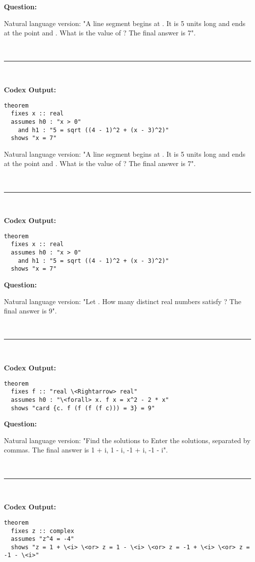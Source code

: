 \documentclass{article}
\begin{document}
\begin{boxB}
\textbf{Question:}

Natural language version: "A line segment begins at . 
It is 5 units long and ends at the point  and . 
What is the value of ? The final answer is 7".

\
\hrule
\

\textbf{Codex Output:}
\begin{lstlisting}
theorem
  fixes x :: real
  assumes h0 : "x > 0"
    and h1 : "5 = sqrt ((4 - 1)^2 + (x - 3)^2)"
  shows "x = 7"
\end{lstlisting}
\end{boxB}

\begin{boxB}
Natural language version: "A line segment begins at . 
It is 5 units long and ends at the point  and . 
What is the value of ? The final answer is 7".

\
\hrule
\

\textbf{Codex Output:}
\begin{lstlisting}
theorem
  fixes x :: real
  assumes h0 : "x > 0"
    and h1 : "5 = sqrt ((4 - 1)^2 + (x - 3)^2)"
  shows "x = 7"  
\end{lstlisting}
\end{boxB}



\begin{boxB}
\textbf{Question:}

Natural language version: "Let . 
How many distinct real numbers  satisfy ? The final answer is 9".

\
\hrule
\

\textbf{Codex Output:}
\begin{lstlisting}
theorem
  fixes f :: "real \<Rightarrow> real"
  assumes h0 : "\<forall> x. f x = x^2 - 2 * x"
  shows "card {c. f (f (f (f c))) = 3} = 9"    
\end{lstlisting}
\end{boxB}



\begin{boxB}
\textbf{Question:}

Natural language version: "Find the solutions to   
Enter the solutions, separated by commas. The final answer is 1 + i, 1 - i, -1 + i, -1 - i".

\
\hrule
\

\textbf{Codex Output:}
\begin{lstlisting}
theorem
  fixes z :: complex
  assumes "z^4 = -4"
  shows "z = 1 + \<i> \<or> z = 1 - \<i> \<or> z = -1 + \<i> \<or> z = -1 - \<i>"   
\end{lstlisting}
\end{boxB}
\end{document}
